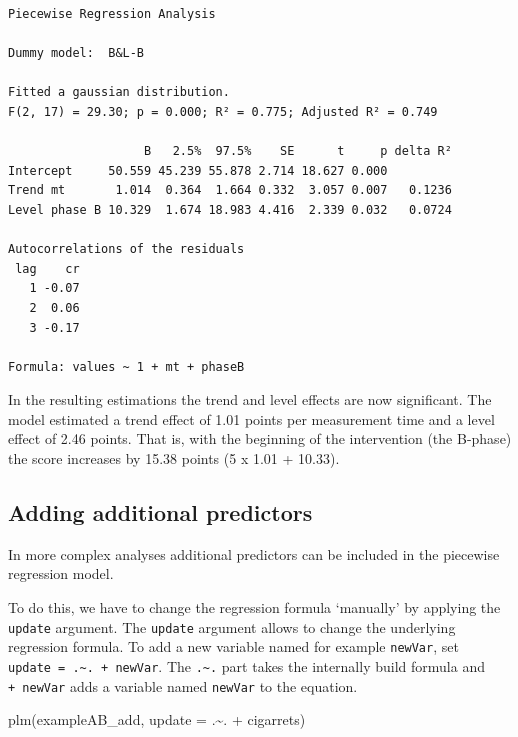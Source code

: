 \documentclass[
]{book}
\newenvironment{Shaded}{\begin{snugshade}}{\end{snugshade}}
\newcommand{\AttributeTok}[1]{\textcolor[rgb]{0.77,0.63,0.00}{#1}}
\newcommand{\FunctionTok}[1]{\textcolor[rgb]{0.00,0.00,0.00}{#1}}
\newcommand{\NormalTok}[1]{#1}
\newcommand{\SpecialCharTok}[1]{\textcolor[rgb]{0.00,0.00,0.00}{#1}}
\begin{document}
\begin{verbatim}
Piecewise Regression Analysis

Dummy model:  B&L-B 

Fitted a gaussian distribution.
F(2, 17) = 29.30; p = 0.000; R² = 0.775; Adjusted R² = 0.749

                   B   2.5%  97.5%    SE      t     p delta R²
Intercept     50.559 45.239 55.878 2.714 18.627 0.000         
Trend mt       1.014  0.364  1.664 0.332  3.057 0.007   0.1236
Level phase B 10.329  1.674 18.983 4.416  2.339 0.032   0.0724

Autocorrelations of the residuals
 lag    cr
   1 -0.07
   2  0.06
   3 -0.17

Formula: values ~ 1 + mt + phaseB
\end{verbatim}

In the resulting estimations the trend and level effects are now significant. The model estimated a trend effect of 1.01 points per measurement time and a level effect of 2.46 points. That is, with the beginning of the intervention (the B-phase) the score increases by 15.38 points (5 x 1.01 + 10.33).

\hypertarget{adding-additional-predictors}{%
\subsection{Adding additional predictors}\label{adding-additional-predictors}}

In more complex analyses additional predictors can be included in the piecewise regression model.

To do this, we have to change the regression formula `manually' by applying the \texttt{update} argument. The \texttt{update} argument allows to change the underlying regression formula. To add a new variable named for example \texttt{newVar}, set \texttt{update\ =\ .\textasciitilde{}.\ +\ newVar}. The \texttt{.\textasciitilde{}.} part takes the internally build formula and \texttt{+\ newVar} adds a variable named \texttt{newVar} to the equation.

\begin{Shaded}
\begin{Highlighting}[]
\FunctionTok{plm}\NormalTok{(exampleAB\_add, }\AttributeTok{update =}\NormalTok{ .}\SpecialCharTok{\textasciitilde{}}\NormalTok{. }\SpecialCharTok{+}\NormalTok{ cigarrets)}
\end{Highlighting}
\end{Shaded}
\end{document}
